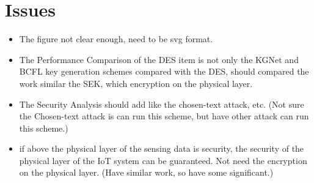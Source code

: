 \documentclass[a4paper]{article}
\begin{document}
\section{Issues}

\begin{itemize}
  \item The figure not clear enough, need to be svg format.
  \item The Performance Comparison of the DES item is not only the KGNet and BCFL key generation schemes compared with the DES, should compared the work similar the SEK, which encryption on the physical layer.
  \item The Security Analysis should add like the chosen-text attack, etc. (Not sure the Chosen-text attack is can run this scheme, but have other attack can run this scheme.)
  \item if above the physical layer of the sensing data is security, the security of the physical layer of the IoT system can be guaranteed. Not need the encryption on the physical layer. (Have similar work, so have some significant.)
\end{itemize}

% 
\end{document}
